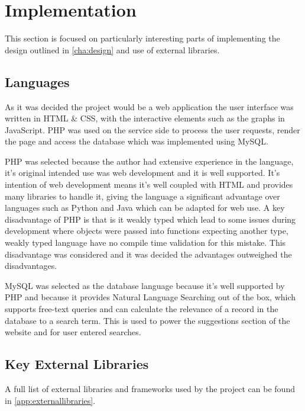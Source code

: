 \begin{comment}
Chapter 4: Implementation
The implementation details should be confined to the important, difficult or interesting aspects. Large chunks of code should be avoided, and diagrams and tables should be used to present details clearly. Other stuff...
\end{comment}

\chapter{Implementation}
This section is focused on particularly interesting parts of implementing the design outlined in \autoref{cha:design} and use of external libraries.

\section{Languages}
As it was decided the project would be a web application the user interface was written in HTML \& CSS, with the interactive elements such as the graphs in JavaScript. PHP was used on the service side to process the user requests, render the page and access the database which was implemented using MySQL.
 
PHP was selected because the author had extensive experience in the language, it's original intended use was web development and it is well supported. It's intention of web development means it's well coupled with HTML and provides many libraries to handle it, giving the language a significant advantage over languages such as Python and Java which can be adapted for web use. A key disadvantage of PHP is that is it weakly typed which lead to some issues during development where objects were passed into functions expecting another type, weakly typed language have no compile time validation for this mistake. This disadvantage was considered and it was decided the advantages outweighed the disadvantages.

MySQL was selected as the database language because it's well supported by PHP and because it provides Natural Language Searching out of the box, which supports free-text queries and can calculate the relevance of a record in the database to a search term. This is used to power the suggestions section of the website and for user entered searches.

\section[Key Libraries]{Key External Libraries}
A full list of external libraries and frameworks used by the project can be found in \autoref{app:externallibraries}.

